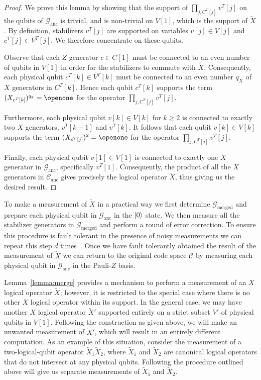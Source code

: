 \documentclass[reprint,
superscriptaddress,
 amsmath,amssymb,
 aps, longbibliography
]{revtex4-1}
\begin{document}
\begin{proof}
We prove this lemma by showing that the support of $\prod_{ j, C^T[j]} v^T[j] $ on the qubits of $\mathcal{G}_\textrm{anc}$ is trivial, and is non-trivial on $V[1]$, which is the support of $\tilde{X}$.  By definition, stabilizers $v^T[j]$ are supported on variables $v[j] \in V[j]$ and $c^T[j] \in V^T[j]$. We therefore concentrate on these qubits.

Observe that each $Z$ generator $c \in C[1]$ must be connected to an even number of qubits in $V[1]$ in order for the stabilizers to commute with $\tilde{X}$. Consequently, each physical qubit $c^T[k] \in V^T[k]$ must be connected to an even number $q_X$ of $X$ generators in $C^T[k]$. Hence each qubit $c^T[k]$ supports the term $(X_{c^T[k]})^{q_x} = \openone$ for the operator $\prod_{ j, C^T[j]} v^T[j] $.

Furthermore, each physical qubit $v[k] \in V[k]$ for $k \geq 2$ is connected to exactly two $X$ generators, $v^T[k-1]$ and $v^T[k]$. It follows that each qubit $ v[k] \in V[k] $ supports the term $(X_{c^T[j]})^{2} = \openone$ for the operator $\prod_{ j, C^T[j]} v^T[j] $. 

Finally, each physical qubit $v[1] \in V[1]$ is connected to exactly one $X$ generator in $\mathcal{G}_{\textrm{anc}}$, specifically $v^T[1]$. Consequently, the product of all the $X$ generators in $\mathcal{C}_\textrm{anc}$ gives precisely the logical operator $\tilde{X}$, thus giving us the desired result.
\end{proof}

To make a measurement of $\tilde{X}$ in a practical way we first determine $\mathcal{G}_\textrm{merged}$ and prepare each physical qubit in $\mathcal{G}_\textrm{anc}$ in the $\ket{0}$ state. We then measure all the stabilizer generators in $\mathcal{G}_\textrm{merged}$ and perform a round of error correction. To ensure this procedure is fault tolerant in the presence of noisy measurements we can repeat this step $d$ times~\cite{Vuillot19}. Once we have fault tolerantly obtained the result of the measurement of $\tilde{X}$ we can return to the original code space $\mathcal{C}$ by measuring each physical qubit in $\mathcal{G}_\textrm{anc}$ in the Pauli-$Z$ basis. 

Lemma~\ref{lemma:merge} provides a mechanism to perform a measurement of an $X$ logical operator $\tilde{X}$; however, it is restricted to the special case where there is no other $X$ logical operator within its support.  In the general case, we may have another $X$ logical operator $\tilde{X}'$ supported entirely on a strict subset $V'$ of physical qubits in $V[1]$. Following the construction as given above, we will make an unwanted measurement of $\tilde{X}'$, which will result in an entirely different computation.  As an example of this situation, consider the measurement of a two-logical-qubit operator $\tilde{X}_1 \tilde{X}_2$, where $\tilde{X}_1$ and $\tilde{X}_2$ are canonical logical operators that do not intersect at any physical qubits.  Following the procedure outlined above will give us separate measurements of $\tilde{X}_1$ and $\tilde{X}_2$. 
\end{document}
